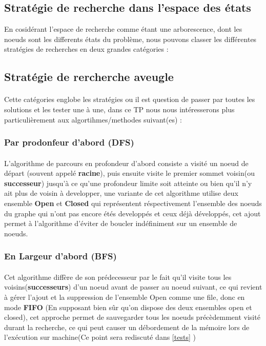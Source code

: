 \subsection{Stratégie de recherche dans l'espace des états}
En cosidérant l'espace de recherche comme étant une arborescence, dont les noeuds sont les differents états du problème, nous pouvons classer les différentes stratégies de recherches en deux grandes catégories :
\subsection{Stratégie de rercherche aveugle}
\paragraph{}Cette catégories englobe les stratégies ou il est question de passer par toutes les solutions et les tester une à une, dans ce TP nous nous intéresserons plus particulièrement aux algortihmes/methodes suivant(es) :  
\subsubsection{Par prodonfeur d'abord (DFS)}
\paragraph{}
L'algorithme de parcours en profondeur d'abord consiste a visité un noeud de départ (souvent appelé \textbf{racine}), puis ensuite visite le premier sommet voisin(ou \textbf{successeur}) jusqu'à ce qu'une profondeur limite soit atteinte ou bien qu'il n'y ait plus de voisin à developper, une variante de cet algorithme utilise deux ensemble \textbf{Open} et \textbf{Closed} qui représentent réspectivement l'ensemble des noeuds du graphe qui n'ont pas encore étés developpés et ceux déjà développés, cet ajout permet à l'algorithme d'éviter de boucler indéfiniment sur un ensemble de noeuds.
\subsubsection{En Largeur d'abord (BFS)}
\paragraph{}
Cet algorithme diffère de son prédecesseur par le fait qu'il visite tous les voisins(\textbf{successeurs}) d'un noeud avant de passer au noeud suivant, ce qui revient à gérer l'ajout et la suppression de l'ensemble Open comme une file, donc en mode \textbf{FIFO} (En supposant bien sûr qu'on dispose des deux ensembles open et closed), cet approche permet de sauvegarder tous les noeuds précèdemment visité durant la recherche, ce qui peut causer un débordement de la mémoire lors de l'exécution sur machine(Ce point sera rediscuté dans \ref{tests} )

